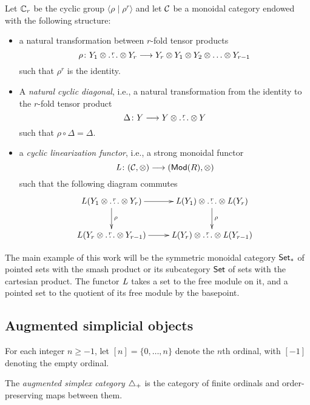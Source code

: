 Let $\mathbb{C}_r$ be the cyclic group $\langle\rho\mid \rho^r\rangle$ and let $\mathcal{C}$ be a monoidal category %
endowed with the following structure:
\begin{itemize}
    \item a natural transformation between $r$-fold tensor products
	\[
	\rho\colon Y_1\otimes  \overset{r}{\ldots}\otimes Y_r\longrightarrow Y_r\otimes Y_1\otimes Y_2\otimes \ldots \otimes Y_{r-1}
	\]
	such that $\rho^r$ is the identity.
	\item A \emph{natural cyclic diagonal}, i.e., a natural transformation from the identity to the $r$-fold tensor product
	\[
	\Delta\colon Y\longrightarrow Y\otimes \overset{r}{\ldots}\otimes Y
	\]
	such that $\rho\circ \Delta = \Delta$.
	\item a \emph{cyclic linearization functor}, i.e., a %
    strong monoidal functor
	\[
    \operatorname{{\it L}}\colon (\mathcal{C},\otimes)\longrightarrow (\mathsf{Mod}(R),\otimes)
	\]
	such that the following diagram commutes
	\[
	\xymatrix{
		L(Y_1\otimes \overset{r}{\ldots} \otimes Y_r)  \ar[r]\ar[d]^{\rho} & \abel(Y_1)\otimes \overset{r}{\ldots} \otimes \abel(Y_r)\ar[d]^{\rho} \\
		L(Y_{r}\otimes \overset{r}{\ldots} \otimes Y_{r-1})  \ar[r] & \abel(Y_r)\otimes \overset{r}{\ldots} \otimes \abel(Y_{r-1}) }
	\]
\end{itemize}
The main example of this work will be the symmetric monoidal category $\mathsf{Set}_*$ of pointed sets with the smash product or its subcategory $\mathsf{Set}$ of sets with the cartesian product. The functor $\operatorname{{\it L}}$ takes a set to the free module on it, and a pointed set to the quotient of its free module by the basepoint.

\subsection{Augmented simplicial objects}\label{s:simplices}

For each integer $n\geq -1$, let $[n] = \{0,\ldots,n\}$ denote the $n$th ordinal, with $[-1]$ denoting the empty ordinal.

\begin{definition}
	The \emph{augmented simplex category} $\triangle_{+}$ is the category of finite ordinals and order-preserving maps between them. %
\end{definition}

